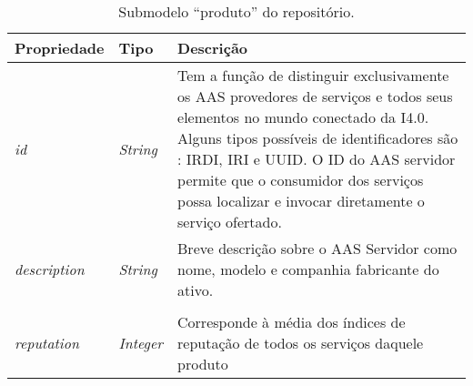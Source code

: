 \begin{table}[htb]
	\centering
	\caption{Submodelo ``produto'' do repositório.}
	\begin{tabular}{p{3cm}p{2cm}p{9cm}}
		\hline
		\textbf{Propriedade}
		 & \textbf{Tipo}
		 & \textbf{Descrição}                                                                                                                                                                                                                                                                                                                                               \\

		\hline
		\textit{id}
		 & \textit{String}
		 & Tem a função de distinguir exclusivamente os AAS provedores de serviços e todos seus elementos \cite{adolphs2016structure} no mundo conectado da I4.0. Alguns tipos possíveis de identificadores são \cite{bader2019aas}: IRDI, IRI e UUID. O ID do AAS servidor permite que o consumidor dos serviços possa localizar e invocar diretamente o serviço ofertado. \\

		\hline
		\textit{description}
		 & \textit{String}
		 & Breve descrição sobre o AAS Servidor como nome, modelo e companhia fabricante do ativo.                                                                                                                                                                                                                                                                          \\
		\\

		\hline
		\textit{reputation}
		 & \textit{Integer}
		 & Corresponde à média dos índices de reputação de todos os serviços daquele produto                                                                                                                                                                                                                                                                                \\

		\hline
	\end{tabular}
	\label{tab:repositorio-submodelo-produto}
\end{table}


